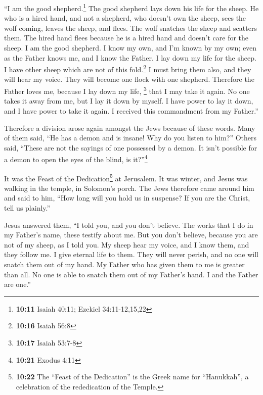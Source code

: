  ``I am the good shepherd.\footnote{\textbf{10:11} Isaiah
  40:11; Ezekiel 34:11-12,15,22} The good shepherd lays down his life
for the sheep.  He who is a hired hand, and not a
shepherd, who doesn't own the sheep, sees the wolf coming, leaves the
sheep, and flees. The wolf snatches the sheep and scatters them.
 The hired hand flees because he is a hired hand and
doesn't care for the sheep.  I am the good shepherd. I
know my own, and I'm known by my own;  even as the Father
knows me, and I know the Father. I lay down my life for the sheep.
 I have other sheep which are not of this
fold.\footnote{\textbf{10:16} Isaiah 56:8} I must bring them also, and
they will hear my voice. They will become one flock with one shepherd.
 Therefore the Father loves me, because I lay down my
life, \footnote{\textbf{10:17} Isaiah 53:7-8} that I may take it again.
 No one takes it away from me, but I lay it down by
myself. I have power to lay it down, and I have power to take it again.
I received this commandment from my Father.''

 Therefore a division arose again amongst the Jews
because of these words.  Many of them said, ``He has a
demon and is insane! Why do you listen to him?''  Others
said, ``These are not the sayings of one possessed by a demon. It isn't
possible for a demon to open the eyes of the blind, is it?''\footnote{\textbf{10:21}
  Exodus 4:11}

 It was the Feast of the Dedication\footnote{\textbf{10:22}
  The ``Feast of the Dedication'' is the Greek name for ``Hanukkah'', a
  celebration of the rededication of the Temple.} at Jerusalem.
 It was winter, and Jesus was walking in the temple, in
Solomon's porch.  The Jews therefore came around him and
said to him, ``How long will you hold us in suspense? If you are the
Christ, tell us plainly.''

 Jesus answered them, ``I told you, and you don't
believe. The works that I do in my Father's name, these testify about
me.  But you don't believe, because you are not of my
sheep, as I told you.  My sheep hear my voice, and I know
them, and they follow me.  I give eternal life to them.
They will never perish, and no one will snatch them out of my hand.
 My Father who has given them to me is greater than all.
No one is able to snatch them out of my Father's hand.  I
and the Father are one.''

